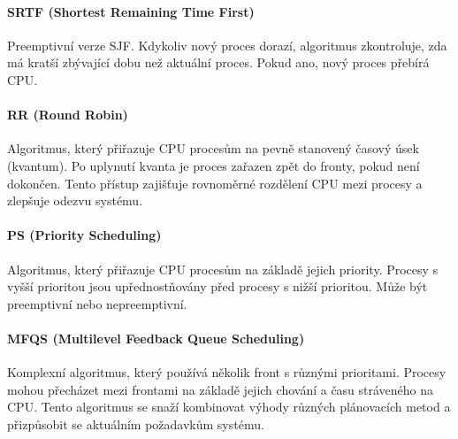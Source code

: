 \paragraph{SRTF (Shortest Remaining Time First)}
Preemptivní verze SJF. Kdykoliv nový proces dorazí, algoritmus zkontroluje, zda má kratší zbývající dobu než aktuální proces. Pokud ano, nový proces přebírá CPU.

\paragraph{RR (Round Robin)}
Algoritmus, který přiřazuje CPU procesům na pevně stanovený časový úsek (kvantum). Po uplynutí kvanta je proces zařazen zpět do fronty, pokud není dokončen. Tento přístup zajišťuje rovnoměrné rozdělení CPU mezi procesy a zlepšuje odezvu systému.

\paragraph{PS (Priority Scheduling)}
Algoritmus, který přiřazuje CPU procesům na základě jejich priority. Procesy s vyšší prioritou jsou upřednostňovány před procesy s nižší prioritou. Může být preemptivní nebo nepreemptivní.

\paragraph{MFQS (Multilevel Feedback Queue Scheduling)}
Komplexní algoritmus, který používá několik front s různými prioritami. Procesy mohou přecházet mezi frontami na základě jejich chování a času stráveného na CPU. Tento algoritmus se snaží kombinovat výhody různých plánovacích metod a přizpůsobit se aktuálním požadavkům systému.